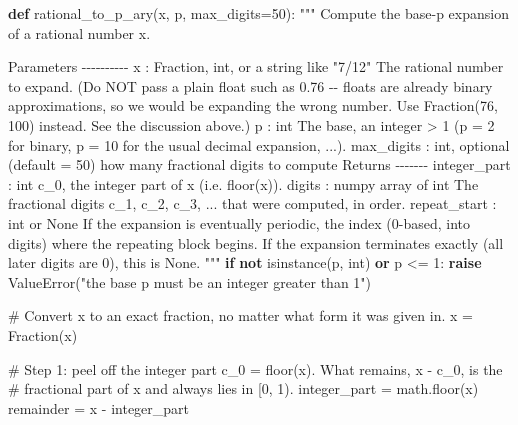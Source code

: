 \documentclass[
  letterpaper,
  DIV=11,
  numbers=noendperiod]{scrreprt}
\newenvironment{Shaded}{\begin{snugshade}}{\end{snugshade}}
\newcommand{\BuiltInTok}[1]{\textcolor[rgb]{0.00,0.23,0.31}{#1}}
\newcommand{\CommentTok}[1]{\textcolor[rgb]{0.37,0.37,0.37}{#1}}
\newcommand{\ControlFlowTok}[1]{\textcolor[rgb]{0.00,0.23,0.31}{\textbf{#1}}}
\newcommand{\DecValTok}[1]{\textcolor[rgb]{0.68,0.00,0.00}{#1}}
\newcommand{\KeywordTok}[1]{\textcolor[rgb]{0.00,0.23,0.31}{\textbf{#1}}}
\newcommand{\NormalTok}[1]{\textcolor[rgb]{0.00,0.23,0.31}{#1}}
\newcommand{\OperatorTok}[1]{\textcolor[rgb]{0.37,0.37,0.37}{#1}}
\newcommand{\PreprocessorTok}[1]{\textcolor[rgb]{0.68,0.00,0.00}{#1}}
\newcommand{\StringTok}[1]{\textcolor[rgb]{0.13,0.47,0.30}{#1}}
\theoremstyle{plain}
\theoremstyle{plain}
\theoremstyle{definition}
\theoremstyle{definition}
\theoremstyle{definition}
\theoremstyle{plain}
\theoremstyle{plain}
\theoremstyle{remark}
\begin{document}
\begin{Shaded}
\begin{Highlighting}[]
\KeywordTok{def}\NormalTok{ rational\_to\_p\_ary(x, p, max\_digits}\OperatorTok{=}\DecValTok{50}\NormalTok{):}
    \CommentTok{"""}
\CommentTok{    Compute the base{-}p expansion of a rational number x.}

\CommentTok{    Parameters}
\CommentTok{    {-}{-}{-}{-}{-}{-}{-}{-}{-}{-}}
\CommentTok{    x : Fraction, int, or a string like "7/12"}
\CommentTok{        The rational number to expand. (Do NOT pass a plain float such as 0.76 {-}{-} floats are}
\CommentTok{        already binary approximations, so we would be expanding the wrong number. Use}
\CommentTok{        Fraction(76, 100) instead. See the discussion above.)}
\CommentTok{    p : int}
\CommentTok{        The base, an integer \textgreater{} 1 (p = 2 for binary, p = 10 for the usual decimal expansion, ...).}
\CommentTok{    max\_digits : int, optional (default = 50)}
\CommentTok{        how many fractional digits to compute }
\CommentTok{        }
\CommentTok{    Returns}
\CommentTok{    {-}{-}{-}{-}{-}{-}{-}}
\CommentTok{    integer\_part : int}
\CommentTok{        c\_0, the integer part of x (i.e. floor(x)).}
\CommentTok{    digits : numpy array of int}
\CommentTok{        The fractional digits c\_1, c\_2, c\_3, ... that were computed, in order.}
\CommentTok{    repeat\_start : int or None}
\CommentTok{        If the expansion is eventually periodic, the index (0{-}based, into \textasciigrave{}digits\textasciigrave{}) where the}
\CommentTok{        repeating block begins. If the expansion terminates exactly (all later digits are 0),}
\CommentTok{        this is None.}
\CommentTok{    """}
    \ControlFlowTok{if} \KeywordTok{not} \BuiltInTok{isinstance}\NormalTok{(p, }\BuiltInTok{int}\NormalTok{) }\KeywordTok{or}\NormalTok{ p }\OperatorTok{\textless{}=} \DecValTok{1}\NormalTok{:}
        \ControlFlowTok{raise} \PreprocessorTok{ValueError}\NormalTok{(}\StringTok{"the base p must be an integer greater than 1"}\NormalTok{)}

    \CommentTok{\# Convert x to an exact fraction, no matter what form it was given in.}
\NormalTok{    x }\OperatorTok{=}\NormalTok{ Fraction(x)}

    \CommentTok{\# Step 1: peel off the integer part c\_0 = floor(x). What remains, x {-} c\_0, is the}
    \CommentTok{\# \textquotesingle{}fractional part\textquotesingle{} of x and always lies in [0, 1).}
\NormalTok{    integer\_part }\OperatorTok{=}\NormalTok{ math.floor(x)}
\NormalTok{    remainder }\OperatorTok{=}\NormalTok{ x }\OperatorTok{{-}}\NormalTok{ integer\_part}


\end{Highlighting}
\end{Shaded}
\end{document}
